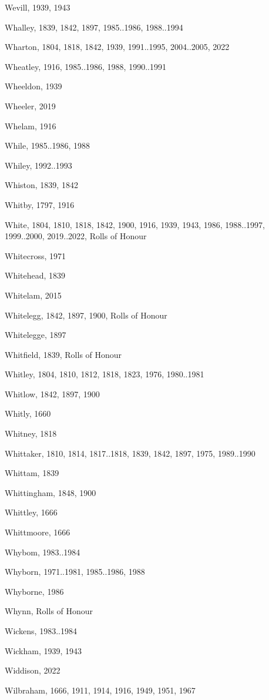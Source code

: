 \begin{theindex}
\item Wevill, 1939, 1943
\item Whalley, 1839, 1842, 1897, 1985..1986, 1988..1994
\item Wharton, 1804, 1818, 1842, 1939, 1991..1995, 2004..2005, 2022
\item Wheatley, 1916, 1985..1986, 1988, 1990..1991
\item Wheeldon, 1939
\item Wheeler, 2019
\item Whelam, 1916
\item While, 1985..1986, 1988
\item Whiley, 1992..1993
\item Whiston, 1839, 1842
\item Whitby, 1797, 1916
\item White, 1804, 1810, 1818, 1842, 1900, 1916, 1939, 1943, 1986, 1988..1997, 1999..2000, 2019..2022, Rolls of Honour
\item Whitecross, 1971
\item Whitehead, 1839
\item Whitelam, 2015
\item Whitelegg, 1842, 1897, 1900, Rolls of Honour
\item Whitelegge, 1897
\item Whitfield, 1839, Rolls of Honour
\item Whitley, 1804, 1810, 1812, 1818, 1823, 1976, 1980..1981
\item Whitlow, 1842, 1897, 1900
\item Whitly, 1660
\item Whitney, 1818
\item Whittaker, 1810, 1814, 1817..1818, 1839, 1842, 1897, 1975, 1989..1990
\item Whittam, 1839
\item Whittingham, 1848, 1900
\item Whittley, 1666
\item Whittmoore, 1666
\item Whybom, 1983..1984
\item Whyborn, 1971..1981, 1985..1986, 1988
\item Whyborne, 1986
\item Whynn, Rolls of Honour
\item Wickens, 1983..1984
\item Wickham, 1939, 1943
\item Widdison, 2022
\item Wilbraham, 1666, 1911, 1914, 1916, 1949, 1951, 1967

\end{theindex}
